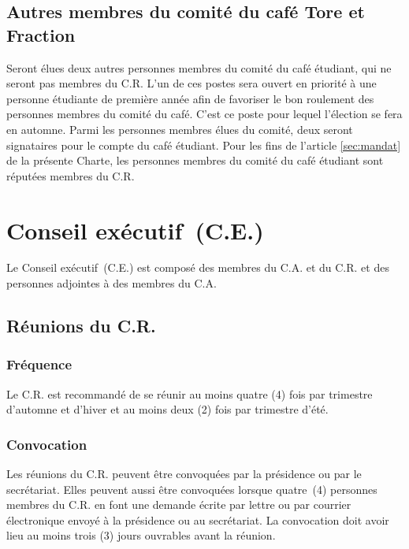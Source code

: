 \documentclass{aediroum}
\newcommand{\article}[1]{article \ref{#1}}
\begin{document}
\subsection{Autres membres du comité du café Tore et Fraction}\label{sec:autres-membres-du-comite-du-cafe-etudiant}

Seront élues deux autres personnes membres du comité du café étudiant, qui ne seront pas membres du C.R. L'un de ces postes sera ouvert en priorité à une personne étudiante de première année afin de favoriser le bon roulement des personnes membres du comité du café. C'est ce poste pour lequel l'élection se fera en automne. Parmi les personnes membres élues du comité, deux seront signataires pour le compte du café étudiant. Pour les fins de l'\article{sec:mandat} de la présente Charte, les personnes membres du comité du café étudiant sont réputées membres du C.R.

\section{Conseil exécutif~(C.E.)}
Le Conseil exécutif~(C.E.) est composé des membres du C.A. et du C.R. et des personnes
adjointes à des membres du C.A.

\subsection{Réunions du C.R.}\label{sec:reunions-du-conseil-dadministration}
\subsubsection{Fréquence}\label{sec:frequence}

Le C.R. est recommandé de se réunir au moins quatre (4) fois par trimestre d'automne et d'hiver et au moins deux (2) fois par trimestre d'été.

\subsubsection{Convocation}\label{sec:convocation-administration}

Les réunions du C.R. peuvent être convoquées par la présidence ou par le secrétariat. Elles peuvent aussi être convoquées lorsque quatre~(4) personnes membres du C.R. en font une demande écrite par lettre ou par courrier électronique envoyé à la présidence ou au secrétariat. La convocation doit avoir lieu au moins trois (3) jours ouvrables avant la réunion.
\end{document}
